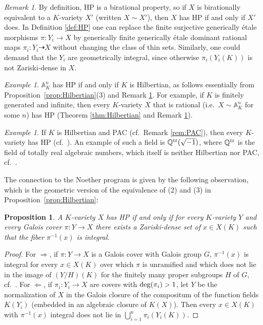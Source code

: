 \documentclass[10pt,a4paper]{amsart}
\theoremstyle{plain}
\newtheorem{proposition}[theorem]{Proposition}
\theoremstyle{remark}
\newtheorem{remark}[theorem]{Remark}
\newtheorem{example}[theorem]{Example}
\numberwithin{theorem}{section}
\begin{document}
\begin{remark}\label{rem:HP}\label{rem:HP_birat}
By definition, HP is a birational property,
so if $X$ is birationally equivalent to a $K$-variety $X'$ (written $X\sim X'$),
then $X$ has HP if and only if $X'$ does.
In Definition \ref{def:HP} one can replace the finite surjective generically \'etale morphisms $\pi\colon Y_i\rightarrow X$ by generically finite generically \'etale dominant rational maps $\pi_i\colon Y_i\dashrightarrow X$ without changing the class of thin sets.
Similarly, one could demand that the $Y_i$ are geometrically integral, since otherwise $\pi_i(Y_i(K))$ is not Zariski-dense in $X$.
\end{remark}

\begin{example}\label{ex:HP_implies_Hilbertian}
$\mathbb{A}^n_K$ has HP if and only if $K$ is Hilbertian, as follows essentially from Proposition~\ref{prop:Hilbertian}(3) and Remark \ref{rem:HP}.
For example, 
if $K$ is finitely generated and infinite,
then every $K$-variety $X$ 
that is rational (i.e.~$X\sim\mathbb{A}_K^n$ for some $n$) has HP (Theorem \ref{thm:Hilbertian} and Remark \ref{rem:HP}).
\end{example}

\begin{example}\label{ex:PAC}
If $K$ is Hilbertian and PAC (cf.~Remark \ref{rem:PAC}),
then every $K$-variety has HP (cf.~\cite[Prop.~5.1]{BFP24}).
An example of such a field is $\mathbb{Q}^{\rm tr}(\sqrt{-1})$,
where $\mathbb{Q}^{\rm tr}$ is the field
of totally real algebraic numbers,
which itself is neither Hilbertian nor PAC,
cf.~\cite[Prop.~5.6]{BFP24}.
\end{example}
 

The connection to the Noether program is given by the following observation, 
which is the geometric version of the equivalence of (2) and (3) in Proposition~\ref{prop:Hilbertian}:

\begin{proposition}
A $K$-variety $X$ has HP if and only if
for every $K$-variety $Y$ and every Galois cover $\pi\colon Y\rightarrow X$ 
there exists a Zariski-dense set of $x\in X(K)$ such that the fiber $\pi^{-1}(x)$ is integral.
\end{proposition}

\begin{proof}
For $\Rightarrow$, 
if $\pi\colon Y\rightarrow X$ is a Galois cover with Galois group $G$,
$\pi^{-1}(x)$ is integral for every $x\in X(K)$ over which $\pi$ is unramified
and which does not lie in the image of $(Y/H)(K)$ for the finitely many proper subgroups $H$ of $G$, cf.~\cite[Prop.~3.3.1]{Serre}.
For $\Leftarrow$, if $\pi_i\colon Y_i\rightarrow X$ are covers with ${\rm deg}(\pi_i)>1$,
let $Y$ be the normalization of $X$ in the Galois closure of the compositum of the function fields
$K(Y_i)$ (embedded in an algebraic closure of $K(X)$).
Then every $x\in X(K)$ with $\pi^{-1}(x)$ integral does not lie in $\bigcup_{i=1}^n\pi_i(Y_i(K))$.  
\end{proof}
\end{document}
